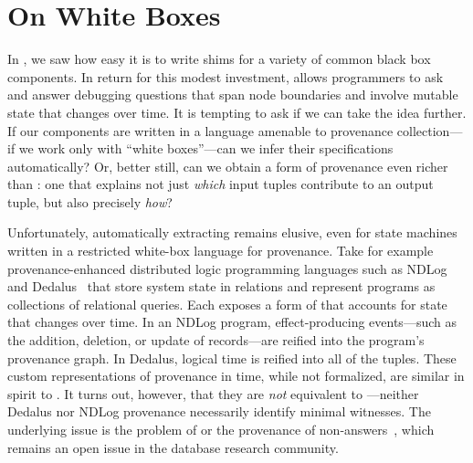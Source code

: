 \section{On White Boxes}
In , we saw how easy it is to write shims for a variety of
common black box components. In return for this modest investment, \fluent{}
allows programmers to ask and answer debugging questions that span node
boundaries and involve mutable state that changes over time. It is tempting to
ask if we can take the idea further. If our components are written in a
language amenable to provenance collection---if we work only with ``white boxes''---can we infer their \watprovenance{}
specifications automatically? Or, better still, can we obtain a form of
provenance even richer than \watprovenance{}: one that explains not just
\emph{which} input tuples contribute to an output tuple, but also precisely
\emph{how}?

Unfortunately, automatically extracting \watprovenance{} remains elusive, even
for state machines written in a restricted white-box language for provenance.
Take for example provenance-enhanced distributed logic programming languages
such as NDLog~\cite{loo2006design} and Dedalus~\cite{alvaro2011dedalus} that
store system state in relations and represent programs as collections of
relational queries. Each exposes a form of \whyprovenance{} that accounts for
state that changes over time. In an NDLog program, effect-producing
events---such as the addition, deletion, or update of records---are reified
into the program's provenance graph. In Dedalus, logical time is reified into
all of the tuples.
%
%
These custom representations of provenance in time, while not formalized, are
similar in spirit to \watprovenance{}. It turns out, however, that they are
\emph{not} equivalent to \watprovenance{}---neither Dedalus nor NDLog
provenance necessarily identify minimal witnesses. The underlying issue is the
problem of  or the provenance of
non-answers~\cite{chapman2009whynot,huang2008nonanswers}, which remains an open
issue in the database research community.

\newcommand{\kvset}{\text{set}}
\newcommand{\kvget}{\text{get}}
\newcommand{\freeze}{\text{freeze}}
\newcommand{\trunc}{\text{trunc}}

